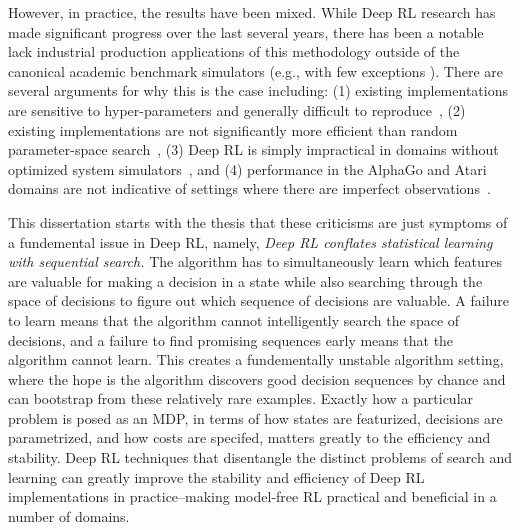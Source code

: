 However, in practice, the results have been mixed. 
While Deep RL research has made significant progress over the last several years, there has been a notable lack industrial production applications of this methodology outside of the canonical academic benchmark simulators (e.g., with few exceptions \cite{mirhoseini2017device}). 
There are several arguments for why this is the case including: (1) existing implementations are sensitive to hyper-parameters and generally difficult to reproduce~\cite{islam2017reproducibility, henderson2017deep}, (2) existing implementations are not significantly more efficient than random parameter-space search~\cite{mania2018simple, salimans2017evolution}, (3) Deep RL is simply impractical in domains without optimized system simulators~\cite{sunderhauf2018limits, stoica2017berkeley}, and (4) performance in the AlphaGo and Atari domains are not indicative of settings where there are imperfect observations~\cite{stoica2017berkeley, sunderhauf2018limits}. 

This dissertation starts with the thesis that these criticisms are just symptoms of a fundemental issue in Deep RL, namely, \emph{Deep RL conflates statistical learning with sequential search.} The algorithm has to simultaneously learn which features are valuable for making a decision in a state while also searching through the space of decisions to figure out which sequence of decisions are valuable. A failure to learn means that the algorithm cannot intelligently search the space of decisions, and a failure to find promising sequences early means that the algorithm cannot learn.
This creates a fundementally unstable algorithm setting, where the hope is the algorithm discovers good decision sequences by chance and can bootstrap from these relatively rare examples. 
Exactly how a particular problem is posed as an MDP, in terms of how states are featurized, decisions are parametrized, and how costs are specifed, matters greatly to the efficiency and stability. Deep RL techniques that disentangle the distinct problems of search and learning can greatly improve the stability and efficiency of Deep RL implementations in practice--making model-free RL practical and beneficial in a number of domains.

